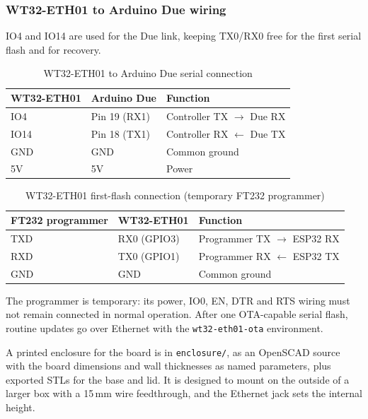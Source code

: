 \documentclass[11pt,a4paper]{article}
\begin{document}
\subsubsection{WT32-ETH01 to Arduino Due wiring}

IO4 and IO14 are used for the Due link, keeping TX0/RX0 free for the first serial flash and for recovery.

\begin{table}[H]
\centering
\caption{WT32-ETH01 to Arduino Due serial connection}
\begin{tabular}{lll}
\toprule
\textbf{WT32-ETH01} & \textbf{Arduino Due} & \textbf{Function} \\
\midrule
IO4 & Pin 19 (RX1) & Controller TX $\rightarrow$ Due RX \\
IO14 & Pin 18 (TX1) & Controller RX $\leftarrow$ Due TX \\
GND & GND & Common ground \\
5V & 5V & Power \\
\bottomrule
\end{tabular}
\end{table}

\begin{table}[H]
\centering
\caption{WT32-ETH01 first-flash connection (temporary FT232 programmer)}
\begin{tabular}{lll}
\toprule
\textbf{FT232 programmer} & \textbf{WT32-ETH01} & \textbf{Function} \\
\midrule
TXD & RX0 (GPIO3) & Programmer TX $\rightarrow$ ESP32 RX \\
RXD & TX0 (GPIO1) & Programmer RX $\leftarrow$ ESP32 TX \\
GND & GND & Common ground \\
\bottomrule
\end{tabular}
\end{table}

The programmer is temporary: its power, IO0, EN, DTR and RTS wiring must not remain connected in normal operation. After one OTA-capable serial flash, routine updates go over Ethernet with the \texttt{wt32-eth01-ota} environment.

A printed enclosure for the board is in \texttt{enclosure/}, as an OpenSCAD source with the board dimensions and wall thicknesses as named parameters, plus exported STLs for the base and lid. It is designed to mount on the outside of a larger box with a 15\,mm wire feedthrough, and the Ethernet jack sets the internal height.
\end{document}
